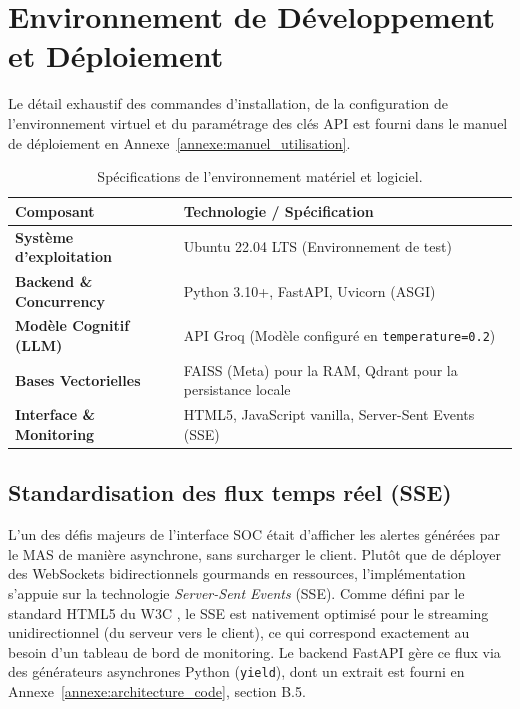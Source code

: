 \documentclass[a4paper, 12pt]{report}
\begin{document}
\section{Environnement de Développement et Déploiement}
\label{sec:environnement_dev}
Le détail exhaustif des commandes d'installation, de la configuration de l'environnement virtuel et du paramétrage des clés API est fourni dans le manuel de déploiement en Annexe~\ref{annexe:manuel_utilisation}.

\begin{table}[htbp]
\centering
\caption[Spécifications de l'environnement matériel et logiciel]{Spécifications de l'environnement matériel et logiciel.}
\label{tab:environnement_tech}
\vspace{0.2cm}
\begin{tabular}{|l|>{\raggedright\arraybackslash}p{8cm}|}
\hline
\textbf{Composant} & \textbf{Technologie / Spécification} \\ \hline
\textbf{Système d'exploitation} & Ubuntu 22.04 LTS (Environnement de test) \\ \hline
\textbf{Backend \& Concurrency} & Python 3.10+, FastAPI, Uvicorn (ASGI) \\ \hline
\textbf{Modèle Cognitif (LLM)} & API Groq (Modèle configuré en \texttt{temperature=0.2}) \\ \hline
\textbf{Bases Vectorielles} & FAISS (Meta) pour la RAM, Qdrant pour la persistance locale \\ \hline
\textbf{Interface \& Monitoring} & HTML5, JavaScript vanilla, Server-Sent Events (SSE) \\ \hline
\end{tabular}
\end{table}

\subsection{Standardisation des flux temps réel (SSE)}
L'un des défis majeurs de l'interface SOC était d'afficher les alertes générées par le MAS de manière asynchrone, sans surcharger le client. Plutôt que de déployer des WebSockets bidirectionnels gourmands en ressources, l'implémentation s'appuie sur la technologie \textit{Server-Sent Events} (SSE). Comme défini par le standard HTML5 du W3C \cite{w3c_sse}, le SSE est nativement optimisé pour le streaming unidirectionnel (du serveur vers le client), ce qui correspond exactement au besoin d'un tableau de bord de monitoring. Le backend FastAPI gère ce flux via des générateurs asynchrones Python (\texttt{yield}), dont un extrait est fourni en Annexe~\ref{annexe:architecture_code}, section B.5.
\end{document}
